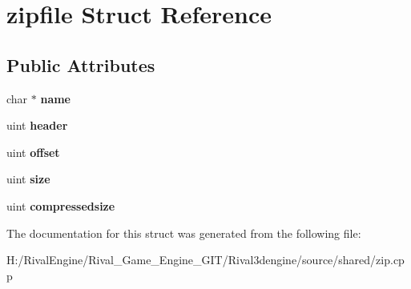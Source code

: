 \hypertarget{structzipfile}{}\section{zipfile Struct Reference}
\label{structzipfile}
\subsection*{Public Attributes}
\begin{DoxyCompactItemize}
\item 
\mbox{\label{structzipfile_ae6cae6afd46ca5aeaa2e43c2fe8f3ca4}} 
char $\ast$ {\bfseries name}
\item 
\mbox{\label{structzipfile_acd06abd34c26f7ae51fa1c5a71a60d46}} 
uint {\bfseries header}
\item 
\mbox{\label{structzipfile_ad818d9bf58e5fcdbcf2b1f4494dd0e14}} 
uint {\bfseries offset}
\item 
\mbox{\label{structzipfile_ad9732d40791e919b64e4523698435468}} 
uint {\bfseries size}
\item 
\mbox{\label{structzipfile_a806748e95e8d5ece4fad9453bc1d3af7}} 
uint {\bfseries compressedsize}
\end{DoxyCompactItemize}


The documentation for this struct was generated from the following file\+:\begin{DoxyCompactItemize}
\item 
H\+:/\+Rival\+Engine/\+Rival\+\_\+\+Game\+\_\+\+Engine\+\_\+\+G\+I\+T/\+Rival3dengine/source/shared/zip.\+cpp\end{DoxyCompactItemize}
